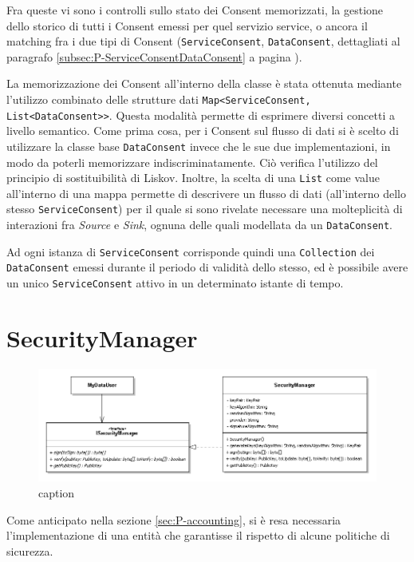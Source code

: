 Fra queste vi sono i controlli sullo stato dei Consent memorizzati, la gestione dello storico di tutti i Consent emessi per quel servizio service, o ancora il matching fra i due tipi di Consent (\texttt{ServiceConsent}, \texttt{DataConsent}, dettagliati al paragrafo \ref{subsec:P-ServiceConsentDataConsent} a pagina \pageref{subsec:P-ServiceConsentDataConsent}).

La memorizzazione dei Consent all’interno della classe \`e stata ottenuta mediante l’utilizzo combinato delle strutture dati \texttt{Map<ServiceConsent,} \texttt{List<DataConsent>>}. Questa modalit\`a permette di esprimere diversi concetti a livello semantico. Come prima cosa, per i Consent sul flusso di dati si \`e scelto di utilizzare la classe base \texttt{DataConsent} invece che le sue due implementazioni, in modo da poterli memorizzare indiscriminatamente. Ci\`o verifica l’utilizzo del principio di sostituibilit\`a di Liskov. Inoltre, la scelta di una \texttt{List} come value all’interno di una mappa permette di descrivere un flusso di dati (all’interno dello stesso \texttt{ServiceConsent}) per il quale si sono rivelate necessare una molteplicit\`a di interazioni fra \textit{Source} e \textit{Sink}, ognuna delle quali modellata da un \texttt{DataConsent}.

Ad ogni istanza di \texttt{ServiceConsent} corrisponde quindi una \texttt{Collection} dei \texttt{DataConsent} emessi durante il periodo di validit\`a dello stesso, ed \`e possibile avere un unico \texttt{ServiceConsent} attivo in un determinato istante di tempo.

\section{SecurityManager}
\begin{figure} [h]
	\includegraphics[width=\linewidth]{pictures/Accounting-SecurityManager.png}
	\caption{caption}
	\label{fig:Accounting-SecurityManager}
\end{figure}
Come anticipato nella sezione \ref{sec:P-accounting}, si \`e resa necessaria l'implementazione di una entit\`a che garantisse il rispetto di alcune politiche di sicurezza.


